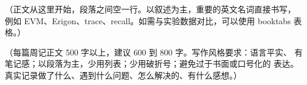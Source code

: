\documentclass[UTF8,fontset=fandol]{ctexart}
\begin{document}

（正文从这里开始，段落之间空一行。以叙述为主，重要的英文名词直接书写，
例如 EVM、Erigon、trace、recall。如需与实验数据对比，可以使用
booktabs 表格。）

（每篇周记正文 500 字以上，建议 600 到 800 字。写作风格要求：语言平实、
有笔记感；以段落为主，少用列表；少用破折号；避免过于书面或口号化的
表达。真实记录做了什么、遇到什么问题、怎么解决的、有什么感想。）
\end{document}

